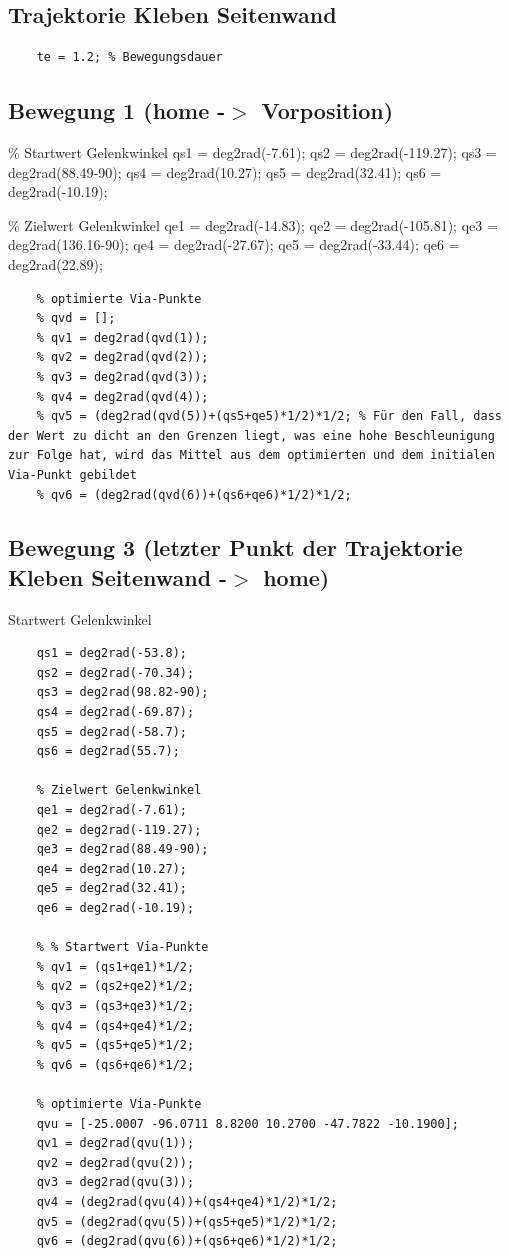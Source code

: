 \subsection*{Trajektorie Kleben Seitenwand}
%
\begin{lstlisting}
	te = 1.2; % Bewegungsdauer
\end{lstlisting}
%
\subsection*{Bewegung 1 (home -\ensuremath{>} Vorposition)}
%
\begin{par}
	\% Startwert Gelenkwinkel qs1 = deg2rad(-7.61); qs2 = deg2rad(-119.27); qs3 = deg2rad(88.49-90); qs4 = deg2rad(10.27); qs5 = deg2rad(32.41); qs6 = deg2rad(-10.19);
\end{par} \vspace{1em}
\begin{par}
	\% Zielwert Gelenkwinkel qe1 = deg2rad(-14.83); qe2 = deg2rad(-105.81); qe3 = deg2rad(136.16-90); qe4 = deg2rad(-27.67); qe5 = deg2rad(-33.44); qe6 = deg2rad(22.89);
\end{par} \vspace{1em}
\begin{lstlisting}
	% optimierte Via-Punkte
	% qvd = [];
	% qv1 = deg2rad(qvd(1));
	% qv2 = deg2rad(qvd(2));
	% qv3 = deg2rad(qvd(3));
	% qv4 = deg2rad(qvd(4));
	% qv5 = (deg2rad(qvd(5))+(qs5+qe5)*1/2)*1/2; % Für den Fall, dass der Wert zu dicht an den Grenzen liegt, was eine hohe Beschleunigung zur Folge hat, wird das Mittel aus dem optimierten und dem initialen Via-Punkt gebildet
	% qv6 = (deg2rad(qvd(6))+(qs6+qe6)*1/2)*1/2;
\end{lstlisting}
%
\subsection*{Bewegung 3 (letzter Punkt der Trajektorie Kleben Seitenwand -\ensuremath{>} home)}
%
\begin{par}
	Startwert Gelenkwinkel
\end{par} \vspace{1em}
\begin{lstlisting}
	qs1 = deg2rad(-53.8);
	qs2 = deg2rad(-70.34);
	qs3 = deg2rad(98.82-90);
	qs4 = deg2rad(-69.87);
	qs5 = deg2rad(-58.7);
	qs6 = deg2rad(55.7);
	
	% Zielwert Gelenkwinkel
	qe1 = deg2rad(-7.61);
	qe2 = deg2rad(-119.27);
	qe3 = deg2rad(88.49-90);
	qe4 = deg2rad(10.27);
	qe5 = deg2rad(32.41);
	qe6 = deg2rad(-10.19);
	
	% % Startwert Via-Punkte
	% qv1 = (qs1+qe1)*1/2;
	% qv2 = (qs2+qe2)*1/2;
	% qv3 = (qs3+qe3)*1/2;
	% qv4 = (qs4+qe4)*1/2;
	% qv5 = (qs5+qe5)*1/2;
	% qv6 = (qs6+qe6)*1/2;
	
	% optimierte Via-Punkte
	qvu = [-25.0007 -96.0711 8.8200 10.2700 -47.7822 -10.1900];
	qv1 = deg2rad(qvu(1));
	qv2 = deg2rad(qvu(2));
	qv3 = deg2rad(qvu(3));
	qv4 = (deg2rad(qvu(4))+(qs4+qe4)*1/2)*1/2;
	qv5 = (deg2rad(qvu(5))+(qs5+qe5)*1/2)*1/2;
	qv6 = (deg2rad(qvu(6))+(qs6+qe6)*1/2)*1/2;
\end{lstlisting}
%
